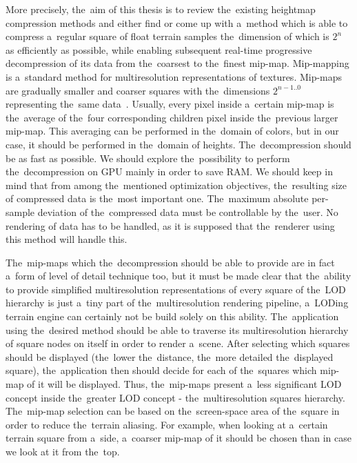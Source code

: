 More precisely, the~aim of this thesis is to review the~existing heightmap compression methods and either find or come up with a~method which is able to compress a~regular square of float terrain samples the~dimension of which is $2^n$ as efficiently as possible, while enabling subsequent real-time progressive decompression of its data from the~coarsest to the~finest mip-map. Mip-mapping is a~standard method for multiresolution representations of textures. Mip-maps are gradually smaller and coarser squares with the~dimensions $2^{n-1 .. 0}$ representing the~same data~\cite{basics}. Usually, every pixel inside a~certain mip-map is the~average of the~four corresponding children pixel inside the~previous larger mip-map. This averaging can be performed in the~domain of colors, but in our case, it should be performed in the~domain of heights. The~decompression should be as fast as possible. We should explore the~possibility to perform the~decompression on GPU mainly in order to save RAM. We should keep in mind that from among the~mentioned optimization objectives, the~resulting size of compressed data is the~most important one. The~maximum absolute per-sample deviation of the~compressed data must be controllable by the~user. No rendering of data has to be handled, as it is supposed that the~renderer using this method will handle this. 

 The~mip-maps which the~decompression should be able to provide are in fact a~form of level of detail technique too, but it must be made clear that the~ability to provide simplified multiresolution representations of every square of the~LOD hierarchy is just a~tiny part of the~multiresolution rendering pipeline, a~LODing terrain engine can certainly not be build solely on this ability. The~application using the~desired method should be able to traverse its multiresolution hierarchy of square nodes on itself in order to render a~scene. After selecting which squares should be displayed (the~lower the~distance, the~more detailed the~displayed square), the~application then should decide for each of the~squares which mip-map of it will be displayed. Thus, the~mip-maps present a~less significant LOD concept inside the~greater LOD concept - the~multiresolution squares hierarchy. The~mip-map selection can be based on the~screen-space area of the~square in order to reduce the~terrain aliasing. For example, when looking at a~certain terrain square from a~side, a~coarser mip-map of it should be chosen than in case we look at it from the~top.

